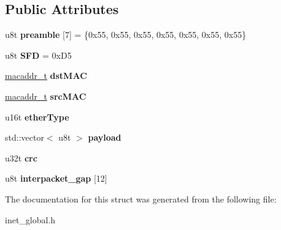\subsection*{Public Attributes}
\begin{DoxyCompactItemize}
\item 
\mbox{\label{structeth__frame__t_a7e917da155e1a71584d77ba116c51537}} 
u8t {\bfseries preamble} \mbox{[}7\mbox{]} = \{0x55, 0x55, 0x55, 0x55, 0x55, 0x55, 0x55\}
\item 
\mbox{\label{structeth__frame__t_a2373b35ac05da6d436fa1369a9868417}} 
u8t {\bfseries S\+FD} = 0x\+D5
\item 
\mbox{\label{structeth__frame__t_ac8ac769f22710edece8c5de6f206b793}} 
\hyperlink{structmacaddr__t}{macaddr\+\_\+t} {\bfseries dst\+M\+AC}
\item 
\mbox{\label{structeth__frame__t_a23bd734d1f17859fca7aa01cf036e21d}} 
\hyperlink{structmacaddr__t}{macaddr\+\_\+t} {\bfseries src\+M\+AC}
\item 
\mbox{\label{structeth__frame__t_a955b35cc93d08eab023f0fa1383a6107}} 
u16t {\bfseries ether\+Type}
\item 
\mbox{\label{structeth__frame__t_aa4b072edd94e393936b674c077dcf001}} 
std\+::vector$<$ u8t $>$ {\bfseries payload}
\item 
\mbox{\label{structeth__frame__t_ab479ce46f2f16015beb4f05eccae7b52}} 
u32t {\bfseries crc}
\item 
\mbox{\label{structeth__frame__t_aa64d327330c12dd5675c9b3ea5b717db}} 
u8t {\bfseries interpacket\+\_\+gap} \mbox{[}12\mbox{]}
\end{DoxyCompactItemize}


The documentation for this struct was generated from the following file\+:\begin{DoxyCompactItemize}
\item 
inet\+\_\+global.\+h\end{DoxyCompactItemize}
